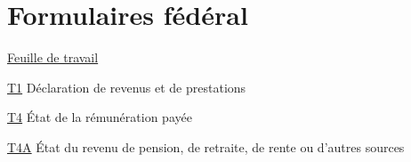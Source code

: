 \chapter*{Formulaires fédéral}

\href{https://www.canada.ca/fr/agence-revenu/services/formulaires-publications/trousses-impot-toutes-annees-imposition/trousse-generale-impot-prestations/5000-d1.html}{Feuille de travail}

\href{https://www.canada.ca/fr/agence-revenu/services/formulaires-publications/trousses-impot-toutes-annees-imposition/trousse-generale-impot-prestations/quebec/5005-r.html}{T1}
Déclaration de revenus et de prestations

\href{https://www.canada.ca/fr/agence-revenu/services/formulaires-publications/formulaires/t4.html}{T4}
État de la rémunération payée

\href{https://www.canada.ca/fr/agence-revenu/services/formulaires-publications/formulaires/t4a.html}{T4A}
État du revenu de pension, de retraite, de rente ou d'autres sources

